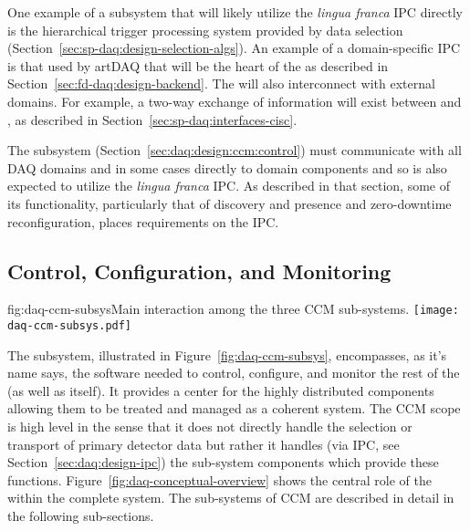 One example of a subsystem that will likely utilize the \textit{lingua franca} IPC directly is the hierarchical trigger processing system provided by data selection (Section~\ref{sec:sp-daq:design-selection-algs}).
An example of a domain-specific IPC is that used by artDAQ that will be the heart of the  as described in Section~\ref{sec:fd-daq:design-backend}.
The  will also interconnect with external domains. 
For example, a two-way exchange of information will exist between  and , as described in Section~\ref{sec:sp-daq:interfaces-cisc}.  

The  subsystem (Section~\ref{sec:daq:design:ccm:control}) must communicate with all DAQ domains and in some cases directly to domain components and so is also expected to utilize the \textit{lingua franca} IPC. 
As described in that section, some of its functionality, particularly that of discovery and presence and zero-downtime reconfiguration, places requirements on the IPC.



\subsection{Control, Configuration, and Monitoring}
\label{sec:fd-daq:design-run-control}


\begin{dunefigure}{fig:daq-ccm-subsys}{Main interaction among the three CCM sub-systems.}
  \texttt{[image: daq-ccm-subsys.pdf]}
\end{dunefigure}

The  subsystem, illustrated in Figure~\ref{fig:daq-ccm-subsys}, encompasses, as it's name says, the software needed to control, configure, and monitor the rest of the  (as well as itself).
It provides a center for the highly distributed  components allowing them to be treated and managed as a coherent system. 
The CCM scope is high level in the sense that it does not directly handle the selection or transport of primary detector data but rather it handles (via IPC, see Section~\ref{sec:daq:design-ipc}) the sub-system components which provide these functions.
Figure~\ref{fig:daq-conceptual-overview} shows the central role of the  within the complete  system.
The sub-systems of CCM are described in detail in the following sub-sections.


